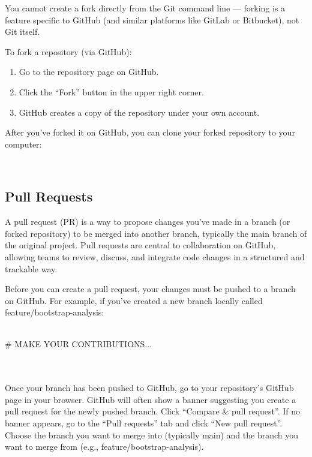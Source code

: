 You cannot create a fork directly from the Git command line --- forking is a feature specific to GitHub (and similar platforms like GitLab or Bitbucket), not Git itself.

\noindent To fork a repository (via GitHub):
\begin{enumerate}
\item Go to the repository page on GitHub.
\item Click the ``Fork'' button in the upper right corner.
\item GitHub creates a copy of the repository under your own account.
\end{enumerate}

\noindent After you've forked it on GitHub, you can clone your forked repository to your computer:
\begin{terminal}
\\
\end{terminal}

\subsection*{Pull Requests}
A pull request (PR) is a way to propose changes you've made in a branch (or forked repository) to be merged into another branch, typically the main branch of the original project. Pull requests are central to collaboration on GitHub, allowing teams to review, discuss, and integrate code changes in a structured and trackable way.

Before you can create a pull request, your changes must be pushed to a branch on GitHub. For example, if you've created a new branch locally called feature/bootstrap-analysis:
\begin{terminal}
\\
\# MAKE YOUR CONTRIBUTIONS...\\
\\
\\
\end{terminal}

Once your branch has been pushed to GitHub, go to your repository's GitHub page in your browser. GitHub will often show a banner suggesting you create a pull request for the newly pushed branch. Click ``Compare \& pull request''. If no banner appears, go to the ``Pull requests'' tab and click ``New pull request''. Choose the branch you want to merge into (typically main) and the branch you want to merge from (e.g., feature/bootstrap-analysis).

